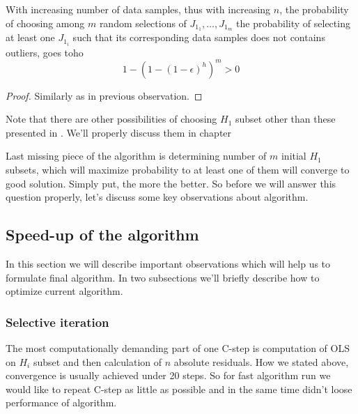 \begin{observation} \label{prandomsamples}
	With increasing number of data samples, thus with increasing $n$, the probability of choosing among $m$ random selections of $J_{1_1}, \ldots ,J_{1_m}$ the probability of selecting
	at least one $J_{1_i}$ such that its corresponding data samples does not contains outliers, goes toho
	$$ 1-(1-(1-\epsilon)^h)^m  > 0$$
\end{observation}

\begin{proof}
	Similarly as in previous observation.
\end{proof}

\begin{itshape}
Note that there are other possibilities of choosing $H_1$ subset other than these presented in \cite{rouss:2000}.
We'll properly discuss them in chapter 
\end{itshape}

Last missing piece of the algorithm is determining number of $m$ initial $H_1$ subsets, which will maximize probability to at least one of them will converge to good solution. Simply put, the more the better. So before we will answer this question properly, let's discuss some key observations about algorithm.


\subsection{Speed-up of the algorithm}
In this section we will describe important observations which will help us to formulate final algorithm. In two subsections we'll briefly describe how to optimize current algorithm. 

\subsubsection{Selective iteration}
The most computationally demanding part of one C-step is computation of OLS on $H_i$ subset and then 
calculation of $n$ absolute residuals. How we stated above, convergence is usually achieved under 20 steps. 
So for fast algorithm run we would like to repeat C-step as little as possible and in the same time didn't loose performance of algorithm. 

